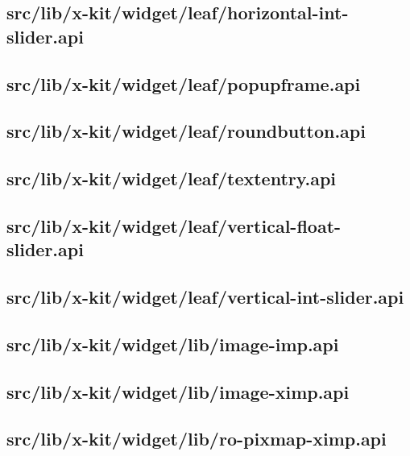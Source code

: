 \subsection{src/lib/x-kit/widget/leaf/horizontal-int-slider.api}


\subsection{src/lib/x-kit/widget/leaf/popupframe.api}


\subsection{src/lib/x-kit/widget/leaf/roundbutton.api}


\subsection{src/lib/x-kit/widget/leaf/textentry.api}


\subsection{src/lib/x-kit/widget/leaf/vertical-float-slider.api}


\subsection{src/lib/x-kit/widget/leaf/vertical-int-slider.api}


\subsection{src/lib/x-kit/widget/lib/image-imp.api}


\subsection{src/lib/x-kit/widget/lib/image-ximp.api}


\subsection{src/lib/x-kit/widget/lib/ro-pixmap-ximp.api}


